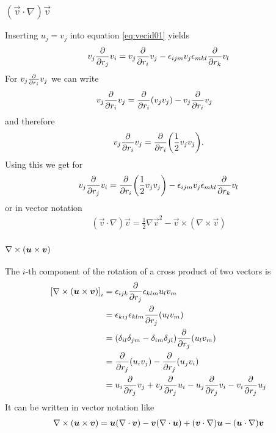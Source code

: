 \subsubsection{$(\vec{v}\cdot\nabla) \vec{v}$}
Inserting $u_j=v_j$ into equation \eqref{eq:vecid01} yields
\begin{align*}
v_j \frac{\partial}{\partial r_j} v_i = v_j \frac{\partial}{\partial r_i} v_j 
- \epsilon_{ijm} v_j \epsilon_{mkl} \frac{\partial}{\partial r_k} v_l
\end{align*}
For $v_j \frac{\partial}{\partial r_i} v_j$ we can write
\begin{align*}
v_j \frac{\partial}{\partial r_i} v_j &= \frac{\partial}{\partial r_i} (v_j v_j) - v_j \frac{\partial}{\partial r_i} v_j
\end{align*}
and therefore
\begin{align*}
v_j \frac{\partial}{\partial r_i} v_j = \frac{\partial}{\partial r_i} { \left( \frac{1}{2} v_j v_j \right) }.
\end{align*}
Using this we get for
\begin{align*}
v_j \frac{\partial}{\partial r_j} v_i = \frac{\partial}{\partial r_i} { \left( \frac{1}{2} v_j v_j \right) }
- \epsilon_{ijm} v_j \epsilon_{mkl} \frac{\partial}{\partial r_k} v_l
\end{align*}
or in vector notation
\begin{align}
(\vec{v}\cdot\nabla) \vec{v} = 
\frac{1}{2} \nabla \vec{v}^2-\vec{v} \times (\nabla \times \vec{v})
\label{eq:vecid02}
\end{align}
\subsubsection{$\nabla \times { \left( \boldsymbol{u} \times \boldsymbol{v} \right) }$}
The $i$-th component of the rotation of a cross product of two vectors is
\begin{align*}
{ \left[ \nabla \times { \left( \boldsymbol{u} \times \boldsymbol{v} \right) } \right] }_i 
&= \epsilon_{ijk} \frac{\partial}{\partial r_j} \epsilon_{klm} u_l v_m \\
&= \epsilon_{kij} \epsilon_{klm} \frac{\partial}{\partial r_j} (u_l v_m) \\
&= (\delta_{il}\delta_{jm}-\delta_{im}\delta_{jl}) \frac{\partial}{\partial r_j} (u_l v_m) \\
&= \frac{\partial}{\partial r_j} (u_i v_j) - \frac{\partial}{\partial r_j} (u_j v_i) \\
&= u_i \frac{\partial}{\partial r_j} v_j + v_j \frac{\partial}{\partial r_j} u_i - u_j \frac{\partial}{\partial r_j} v_i - v_i \frac{\partial}{\partial r_j} u_j
\end{align*}
It can be written in vector notation like
\begin{align}
\nabla \times { \left( \boldsymbol{u} \times \boldsymbol{v} \right) } 
= \boldsymbol{u} (\nabla \cdot \boldsymbol{v}) - \boldsymbol{v} (\nabla \cdot \boldsymbol{u})
+ (\boldsymbol{v} \cdot \nabla) \boldsymbol{u} - (\boldsymbol{u} \cdot \nabla) \boldsymbol{v}
\end{align}

